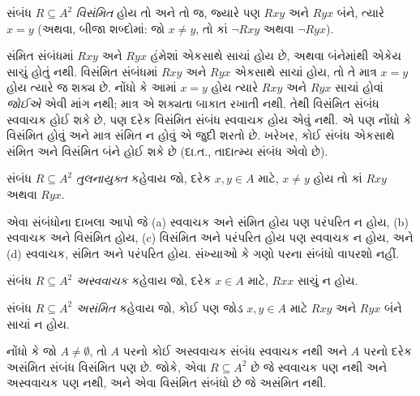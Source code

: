\begin{defn}[વિસંમિતતા]
સંબંધ $R \subseteq A^2$ \emph{વિસંમિત} હોય તો અને તો જ,
જ્યારે પણ $Rxy$ અને $Ryx$ બંને, ત્યારે $x=y$
(અથવા, બીજા શબ્દોમાં: જો $x\neq y$, તો
કાં $\lnot Rxy$ અથવા $\lnot Ryx$).
\end{defn}

\begin{explain}
સંમિત સંબંધમાં $Rxy$ અને $Ryx$ હંમેશાં એકસાથે સાચાં હોય છે,
અથવા બંનેમાંથી એકેય સાચું હોતું નથી. વિસંમિત સંબંધમાં
$Rxy$ અને $Ryx$ એકસાથે સાચાં હોય, તો તે માત્ર $x = y$
હોય ત્યારે જ શક્ય છે. નોંધો કે આમાં $x = y$ હોય ત્યારે
$Rxy$ અને $Ryx$ સાચાં હોવાં \emph{જોઈએ} એવી માંગ નથી;
માત્ર એ શક્યતા બાકાત રખાતી નથી. તેથી વિસંમિત સંબંધ
સ્વવાચક હોઈ શકે છે, પણ દરેક વિસંમિત સંબંધ સ્વવાચક હોય
એવું નથી. એ પણ નોંધો કે વિસંમિત હોવું અને માત્ર સંમિત
ન હોવું એ જુદી શરતો છે. ખરેખર, કોઈ સંબંધ એકસાથે સંમિત
અને વિસંમિત બંને હોઈ શકે છે (દા.ત., તાદાત્મ્ય સંબંધ એવો છે).
\end{explain}

\begin{defn}[તુલનાયુક્તતા]
સંબંધ $R \subseteq A^2$ \emph{તુલનાયુક્ત} કહેવાય જો,
દરેક $x,y\in A$ માટે, $x \neq y$ હોય તો
કાં $Rxy$ અથવા $Ryx$.
\end{defn}

\begin{prob}
એવા સંબંધોના દાખલા આપો જે (a) સ્વવાચક અને સંમિત હોય પણ
પરંપરિત ન હોય, (b) સ્વવાચક અને વિસંમિત હોય,
(c) વિસંમિત અને પરંપરિત હોય પણ સ્વવાચક ન હોય, અને
(d) સ્વવાચક, સંમિત અને પરંપરિત હોય.
સંખ્યાઓ કે ગણો પરના સંબંધો વાપરશો નહીં.
\end{prob}

\begin{defn}[અસ્વવાચકતા]
સંબંધ $R \subseteq A^2$ \emph{અસ્વવાચક} કહેવાય જો,
દરેક $x \in A$ માટે, $Rxx$ સાચું ન હોય.
\end{defn}

\begin{defn}[અસંમિતતા]
સંબંધ $R \subseteq A^2$ \emph{અસંમિત} કહેવાય જો,
કોઈ પણ જોડ $x,y\in A$ માટે $Rxy$ અને $Ryx$ બંને સાચાં ન હોય.
\end{defn}

નોંધો કે જો $A \neq \emptyset$, તો $A$ પરનો કોઈ અસ્વવાચક
સંબંધ સ્વવાચક નથી અને $A$ પરનો દરેક અસંમિત સંબંધ વિસંમિત
પણ છે. જોકે, એવા $R \subseteq A^2$ છે જે સ્વવાચક પણ
નથી અને અસ્વવાચક પણ નથી, અને એવા વિસંમિત સંબંધો છે
જે અસંમિત નથી.
\endgroup


\begingroup
\makeatletter{}\makeatother


